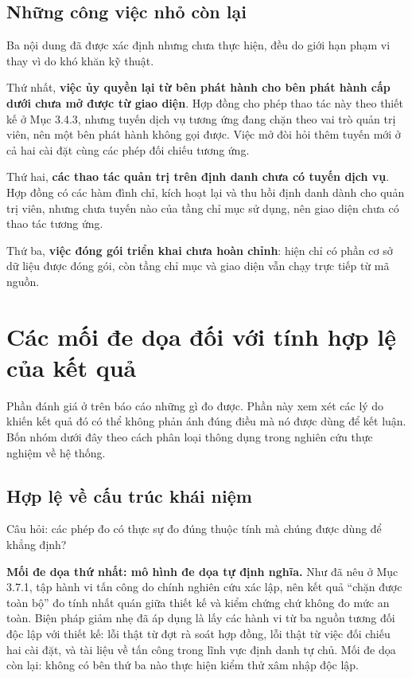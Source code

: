 \subsection{Những công việc nhỏ còn lại}

Ba nội dung đã được xác định nhưng chưa thực hiện, đều do giới hạn phạm vi thay vì do khó khăn kỹ thuật.

Thứ nhất, \textbf{việc ủy quyền lại từ bên phát hành cho bên phát hành cấp dưới chưa mở được từ giao diện}. Hợp đồng cho phép thao tác này theo thiết kế ở Mục 3.4.3, nhưng tuyến dịch vụ tương ứng đang chặn theo vai trò quản trị viên, nên một bên phát hành không gọi được. Việc mở đòi hỏi thêm tuyến mới ở cả hai cài đặt cùng các phép đối chiếu tương ứng.

Thứ hai, \textbf{các thao tác quản trị trên định danh chưa có tuyến dịch vụ}. Hợp đồng có các hàm đình chỉ, kích hoạt lại và thu hồi định danh dành cho quản trị viên, nhưng chưa tuyến nào của tầng chỉ mục sử dụng, nên giao diện chưa có thao tác tương ứng.

Thứ ba, \textbf{việc đóng gói triển khai chưa hoàn chỉnh}: hiện chỉ có phần cơ sở dữ liệu được đóng gói, còn tầng chỉ mục và giao diện vẫn chạy trực tiếp từ mã nguồn.

\section{Các mối đe dọa đối với tính hợp lệ của kết quả}

Phần đánh giá ở trên báo cáo những gì đo được. Phần này xem xét các lý do khiến kết quả đó có thể không phản ánh đúng điều mà nó được dùng để kết luận. Bốn nhóm dưới đây theo cách phân loại thông dụng trong nghiên cứu thực nghiệm về hệ thống.

\subsection{Hợp lệ về cấu trúc khái niệm}

Câu hỏi: các phép đo có thực sự đo đúng thuộc tính mà chúng được dùng để khẳng định?

\noindent \textbf{Mối đe dọa thứ nhất: mô hình đe dọa tự định nghĩa.} Như đã nêu ở Mục 3.7.1, tập hành vi tấn công do chính nghiên cứu xác lập, nên kết quả {``}chặn được toàn bộ{''} đo tính nhất quán giữa thiết kế và kiểm chứng chứ không đo mức an toàn. Biện pháp giảm nhẹ đã áp dụng là lấy các hành vi từ ba nguồn tương đối độc lập với thiết kế: lỗi thật từ đợt rà soát hợp đồng, lỗi thật từ việc đối chiếu hai cài đặt, và tài liệu về tấn công trong lĩnh vực định danh tự chủ. Mối đe dọa còn lại: không có bên thứ ba nào thực hiện kiểm thử xâm nhập độc lập.

